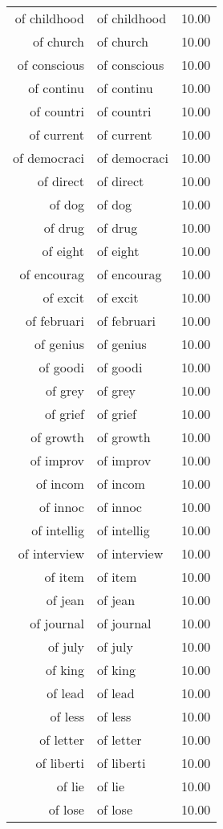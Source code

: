 \begin{table}[ht]
\begin{tabular}{rlr}
  of childhood & of childhood & 10.00 \\ 
  of church & of church & 10.00 \\ 
  of conscious & of conscious & 10.00 \\ 
  of continu & of continu & 10.00 \\ 
  of countri & of countri & 10.00 \\ 
  of current & of current & 10.00 \\ 
  of democraci & of democraci & 10.00 \\ 
  of direct & of direct & 10.00 \\ 
  of dog & of dog & 10.00 \\ 
  of drug & of drug & 10.00 \\ 
  of eight & of eight & 10.00 \\ 
  of encourag & of encourag & 10.00 \\ 
  of excit & of excit & 10.00 \\ 
  of februari & of februari & 10.00 \\ 
  of genius & of genius & 10.00 \\ 
  of goodi & of goodi & 10.00 \\ 
  of grey & of grey & 10.00 \\ 
  of grief & of grief & 10.00 \\ 
  of growth & of growth & 10.00 \\ 
  of improv & of improv & 10.00 \\ 
  of incom & of incom & 10.00 \\ 
  of innoc & of innoc & 10.00 \\ 
  of intellig & of intellig & 10.00 \\ 
  of interview & of interview & 10.00 \\ 
  of item & of item & 10.00 \\ 
  of jean & of jean & 10.00 \\ 
  of journal & of journal & 10.00 \\ 
  of july & of july & 10.00 \\ 
  of king & of king & 10.00 \\ 
  of lead & of lead & 10.00 \\ 
  of less & of less & 10.00 \\ 
  of letter & of letter & 10.00 \\ 
  of liberti & of liberti & 10.00 \\ 
  of lie & of lie & 10.00 \\ 
  of lose & of lose & 10.00 \\ 

\end{tabular}
\end{table}
